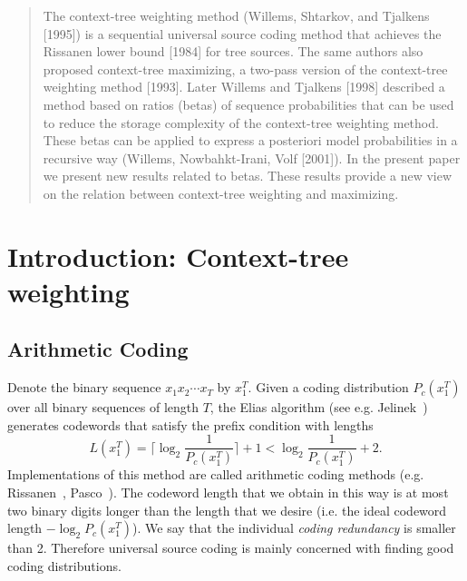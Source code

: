 \documentclass[10pt,conference]{IEEEtran}
\newcommand{\xT}{x^{T}_{1}}
\begin{document}
\begin{abstract}
The context-tree weighting method (Willems, Shtarkov, and Tjalkens [1995]) is a sequential universal source coding method that achieves the Rissanen lower bound [1984] for tree sources.
The same authors also proposed context-tree maximizing, a two-pass version of the context-tree weighting method [1993].
Later Willems and Tjalkens [1998] described a method based on ratios (betas) of sequence probabilities that can be used to reduce the storage complexity of the context-tree weighting method.
These betas can be applied to express a posteriori model probabilities in a recursive way (Willems, Nowbahkt-Irani, Volf [2001]).
In the present paper we present new results related to betas.
These results provide a new view on the relation between context-tree weighting and maximizing.
\end{abstract}

\section{Introduction: Context-tree weighting}
\subsection{Arithmetic Coding}
Denote the binary sequence $x_1 x_2 \cdots x_T$ by $\xT$.
Given a coding distribution $P_{c}(\xT)$ over all binary sequences of length $T$, the Elias algorithm (see e.g. Jelinek~\cite{Jel68}) generates codewords that satisfy the prefix condition with lengths
\begin{equation}
 \label{eq:bndLcod}
L(\xT) = \lceil \log_2 \frac{1}{P_{c}(\xT)} \rceil +1 < \log_2 \frac{1}{P_{c}(\xT)}+2.
\end{equation}
Implementations of this method are called arithmetic coding methods (e.g. Rissanen~\cite{Ris76}, Pasco~\cite{Pas76}).
The codeword length that we obtain in this way is at most two binary digits longer than the length that we desire (i.e. the ideal codeword length $-\log_2 P_c(\xT)$).
We say that the individual {\em coding redundancy} is smaller than 2.
Therefore universal source coding is mainly concerned with finding good coding distributions.

\end{document}

